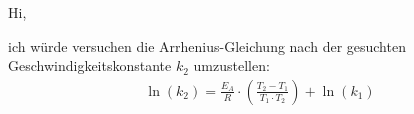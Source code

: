 \documentclass[a4paper,11pt]{article}
\begin{document}
%
%
%
%
%
%
%


Hi,\par 
ich würde versuchen die Arrhenius-Gleichung nach der gesuchten Geschwindigkeitskonstante $k_2$ umzustellen:
\begin{align}
\ln(k_2) = \frac{E_A}{R} \cdot (\frac{T_2-T_1}{T_1 \cdot T_2}) + \ln(k_1)
\end{align}
\end{document}
